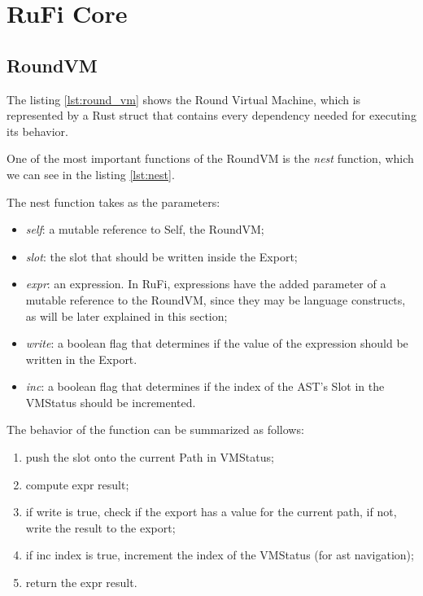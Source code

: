 \section{RuFi Core}

\subsection{RoundVM}
The listing \ref{lst:round_vm} shows the Round Virtual Machine, which is represented by a Rust struct that contains every dependency needed for executing its behavior.



One of the most important functions of the RoundVM is the \textit{nest} function, which we can see in the listing \ref{lst:nest}.



The nest function takes as the parameters:

\begin{itemize}
    \item \textit{self}: a mutable reference to Self, the RoundVM;
    \item \textit{slot}: the slot that should be written inside the Export;
    \item \textit{expr}: an expression. In RuFi, expressions have the added parameter of a mutable reference to the RoundVM, since they may be language constructs, as will be later
          explained in this section;
    \item \textit{write}: a boolean flag that determines if the value of the expression should be written in the Export.
    \item \textit{inc}: a boolean flag that determines if the index of the AST's Slot in the VMStatus should be incremented.
\end{itemize}

The behavior of the function can be summarized as follows:

\begin{enumerate}
    \item push the slot onto the current Path in VMStatus;
    \item compute expr result;
    \item if write is true, check if the export has a value for the current path, if not, write the result to the export;
    \item if inc index is true, increment the index of the VMStatus (for ast navigation);
    \item return the expr result.
\end{enumerate}

